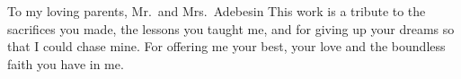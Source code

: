 To my loving parents, Mr.\ and Mrs.\ Adebesin \textemdash  This work is a tribute to the sacrifices you made, the lessons you taught me, and for giving up your dreams so that I could chase mine. For offering me your best, your love and the boundless faith you have in me.